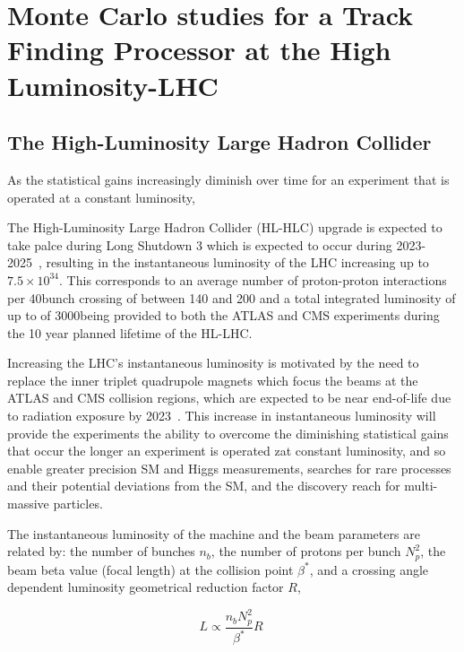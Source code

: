 \chapter{Monte Carlo studies for a Track Finding Processor at the High Luminosity-LHC}\label{chapter:tk-upgrade}
 
\section{The High-Luminosity Large Hadron Collider} \label{sec:hl-lhc}
As the statistical gains increasingly diminish over time for an experiment that is operated at a constant luminosity, 



The High-Luminosity Large Hadron Collider (HL-HLC) upgrade is expected to take palce during Long Shutdown 3 which is expected to occur during 2023-2025~\cite{ApollinariG.:2017ojx}, resulting in the instantaneous luminosity of the LHC increasing up to $7.5 \times {10}^{34}$\percms.
This corresponds to an average number of proton-proton interactions per 40\MHz bunch crossing of between 140 and 200 and a total integrated luminosity of up to of 3000\fbinv being provided to both the ATLAS and CMS experiments during the 10 year planned lifetime of the HL-LHC.

Increasing the LHC's instantaneous luminosity is motivated by the need to replace the inner triplet quadrupole magnets which focus the beams at the ATLAS and CMS collision regions, which are expected to be near end-of-life due to radiation exposure by 2023~\cite{hl-lhc-prelim-design-report,CMSCollaboration:2015zni}.
This increase in instantaneous luminosity will provide the experiments the ability to overcome the diminishing statistical gains that occur the longer an experiment is operated zat constant luminosity, and so enable greater precision SM and Higgs measurements, searches for rare processes and their potential deviations from the SM, and the discovery reach for multi- massive particles.

The instantaneous luminosity of the machine and the beam parameters are related by: the number of bunches $n_{b}$, the number of protons per bunch $N^{2}_{p}$, the beam beta value (focal length) at the collision point $\beta^{*}$, and a crossing angle dependent luminosity geometrical reduction factor $R$,

\begin{equation}
L \propto \frac{n_{b}N^{2}_{p}}{\beta^{*}} R  \;
\label{eq:machineLumi}
\end{equation}

